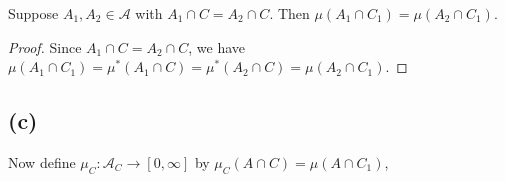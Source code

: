 \documentclass{unswmaths}
\begin{document}
\begin{theorem}
\label{indep}
    Suppose $A_1, A_2 \in \mathcal{A}$ with $A_1\cap C = A_2\cap C$. Then
    $\mu(A_1\cap C_1) = \mu(A_2\cap C_1)$.
\end{theorem}
\begin{proof}
    Since $A_1\cap C = A_2\cap C$, we 
    have $\mu(A_1\cap C_1) = \mu^*(A_1\cap C) = \mu^*(A_2\cap C) = \mu(A_2\cap C_1)$.

%    
%    
%    
%    
%    
%    
\end{proof}


\subsection*{(c)}
Now define $\mu_C:\mathcal{A}_C\rightarrow[0,\infty]$
by $\mu_C(A\cap C) = \mu(A\cap C_1)$,
\end{document}
